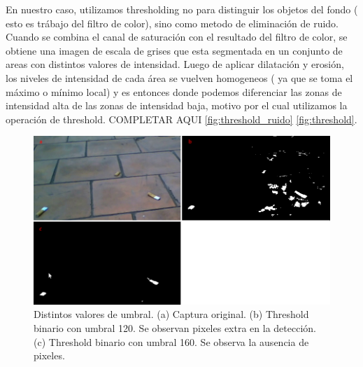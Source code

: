\indent En nuestro caso, utilizamos thresholding no para distinguir los objetos del fondo ( esto es trábajo del filtro de color), sino como metodo de eliminación de ruido. Cuando se combina el canal de saturación con el resultado del filtro de color, se obtiene una imagen de escala de grises que esta segmentada en un conjunto de areas con distintos valores de intensidad. Luego de aplicar dilatación y erosión, los niveles de intensidad de cada área se vuelven homogeneos ( ya que se toma el máximo o mínimo local) y es entonces donde podemos diferenciar las zonas de intensidad alta de las zonas de intensidad baja, motivo por el cual utilizamos la operación de threshold. COMPLETAR AQUI \ref{fig:threshold_ruido} \ref{fig:threshold}. 
\begin{figure}[tpb]
\begin{center}
  \includegraphics[scale=0.4]{figuras/threshold-dif.png}
\end{center}
  \caption{\small Distintos valores de umbral. (a) Captura original. 
  (b) Threshold binario con umbral 120. Se observan pixeles extra en 
  la detección. (c) Threshold binario con umbral 160. Se observa la 
  ausencia de pixeles. }
  \label{fig:thresh-dif}
\end{figure}


